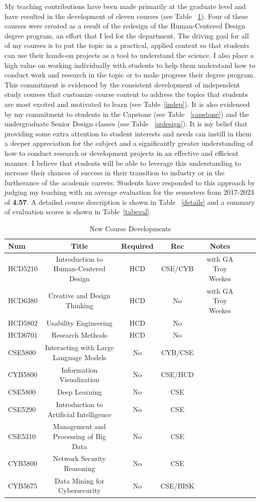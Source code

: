 \documentclass[12pt,letterpaper]{report}
\begin{document}
My teaching contributions have been made primarily at the graduate level and have resulted in the development of eleven courses (see Table ~\ref{newcourse}).  Four of these courses were created as a result of the redesign of the Human-Centered Design degree program, an effort that I led for the department.  The driving goal for all of my courses is to put the topic in a practical, applied context so that students can use their hands-on projects as a tool to understand the science.  I also place a high value on working individually with students to help them understand how to conduct work and research in the topic or to make progress their degree program.  This commitment is evidenced by the consistent development of independent study courses that customize course content to address the topics that students are most excited and motivated to learn (see Table~\ref{indep}).   It is also evidenced by my commitment to students in the Capstone (see Table ~\ref{capstone}) and the undergraduate Senior Design classes (see Table ~\ref{srdesign}).  It is my belief that providing some extra attention to student interests and needs can instill in them a deeper appreciation for the subject and a significantly greater understanding of how to conduct research or development projects in an effective and efficient manner.   I believe that students will be able to leverage this understanding to increase their chances of success in their transition to industry or in the furtherance of the academic careers.  Students have responded to this approach by judging my teaching with an average evaluation for the semesters from 2017-2023 of \textbf{4.57}.  A detailed course description is shown in Table ~\ref{details} and a summary of evaluation scores is shown in Table~\ref{tabeval}.

\begin{table}
\caption{New Course Developments}
\label{newcourse}
\center
\begin{tabular}{| l | c | c | c | c | c | p{1.5in} |}
Num & Title & Required & Rec & Notes \\ \hline
HCD5210 & Introduction to Human-Centered Design & HCD & CSE/CYB & with GA Troy Weekes \\
HCD6380 & Creative and Design Thinking & HCD & No & with GA Troy Weekes \\
HCD5802 & Usability Engineering & HCD & No & \\
HCD6701 & Research Methods & HCD & No & \\
CSE5800 & Interacting with Large Language Models & No & CYB/CSE & \\
CYB5800 & Information Visualization & No & CSE/HCD & \\
CSE5800 & Deep Learning & No & CSE  & \\
CSE5290 & Introduction to Artificial Intelligence & No & CSE & \\
CSE5310 & Management and Processing of Big Data & No & CSE & \\
CYB5800 & Network Security Reasoning & No & CSE & \\
CYB5675 & Data Mining for Cybersecurity & No  & CSE/BISK & \\
\end{tabular}
\end{table}
\end{document}
